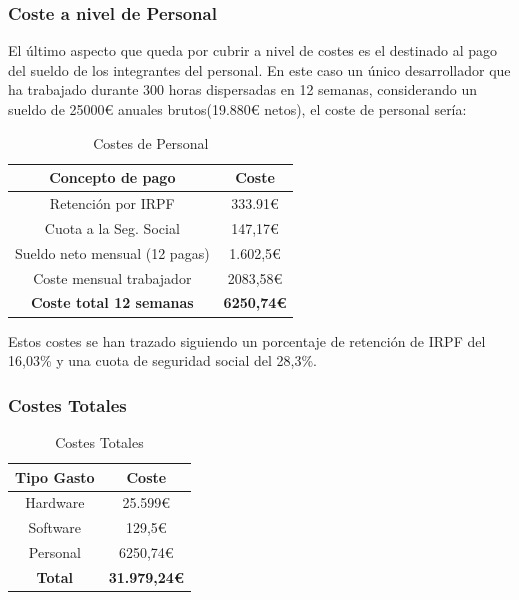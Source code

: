 \subsubsection{Coste a nivel de Personal}
El último aspecto que queda por cubrir a nivel de costes es el destinado al pago del sueldo de los integrantes del personal. En este caso un único desarrollador que ha trabajado durante 300 horas dispersadas en 12 semanas, considerando un sueldo de 25000€ anuales brutos(19.880€ netos), el coste de personal sería: 

\begin{table}[h]
    \centering
    \begin{tabular}{c|c}
    \hline
        Concepto de pago & Coste  \\ \hline
       Retención por IRPF	& 333.91€ \\
       Cuota a la Seg. Social	& 147,17€ \\
       Sueldo neto mensual (12 pagas)  &  1.602,5€ \\
       Coste mensual trabajador & 2083,58€ \\ \hline
       \textbf{Coste total 12 semanas} & \textbf{6250,74€}\\ \hline
    \end{tabular}
    \caption{Costes de Personal}
    \label{Costes de Personal}
\end{table}
Estos costes se han trazado siguiendo un porcentaje de retención de IRPF del 16,03\% y una cuota de seguridad social del 28,3\%.

\subsubsection{Costes Totales}
\begin{table}[h]
    \centering
    \begin{tabular}{c|c}
       \hline Tipo Gasto & Coste  \\ \hline
         Hardware & 25.599€ \\
         Software & 129,5€ \\
         Personal & 6250,74€ \\ \hline
         \textbf{Total} & \textbf{31.979,24€} \\ \hline
    \end{tabular}
    \caption{Costes Totales}
    \label{Costes Totales}
\end{table}



